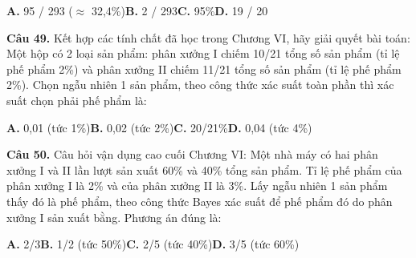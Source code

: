 \documentclass[11pt,a4paper]{article}
\begin{document}
\hspace*{1.5em}\textbf{A.} 95 / 293 ($\approx$ 32,4\%)\quad\quad \textbf{B.} 2 / 293\quad\quad \textbf{C.} 95\%\quad\quad \textbf{D.} 19 / 20\par\vspace{2pt}
\textbf{\color{primary} Câu 49.} Kết hợp các tính chất đã học trong Chương VI, hãy giải quyết bài toán: Một hộp có 2 loại sản phẩm: phân xưởng I chiếm 10/21 tổng số sản phẩm (tỉ lệ phế phẩm 2\%) và phân xưởng II chiếm 11/21 tổng số sản phẩm (tỉ lệ phế phẩm 2\%). Chọn ngẫu nhiên 1 sản phẩm, theo công thức xác suất toàn phần thì xác suất chọn phải phế phẩm là:\par
\hspace*{1.5em}\textbf{A.} 0,01 (tức 1\%)\quad\quad \textbf{B.} 0,02 (tức 2\%)\quad\quad \textbf{C.} 20/21\%\quad\quad \textbf{D.} 0,04 (tức 4\%)\par\vspace{2pt}
\textbf{\color{primary} Câu 50.} Câu hỏi vận dụng cao cuối Chương VI: Một nhà máy có hai phân xưởng I và II lần lượt sản xuất 60\% và 40\% tổng sản phẩm. Tỉ lệ phế phẩm của phân xưởng I là 2\% và của phân xưởng II là 3\%. Lấy ngẫu nhiên 1 sản phẩm thấy đó là phế phẩm, theo công thức Bayes xác suất để phế phẩm đó do phân xưởng I sản xuất bằng. Phương án đúng là:\par
\hspace*{1.5em}\textbf{A.} 2/3\quad\quad \textbf{B.} 1/2 (tức 50\%)\quad\quad \textbf{C.} 2/5 (tức 40\%)\quad\quad \textbf{D.} 3/5 (tức 60\%)\par\vspace{2pt}
\end{document}
